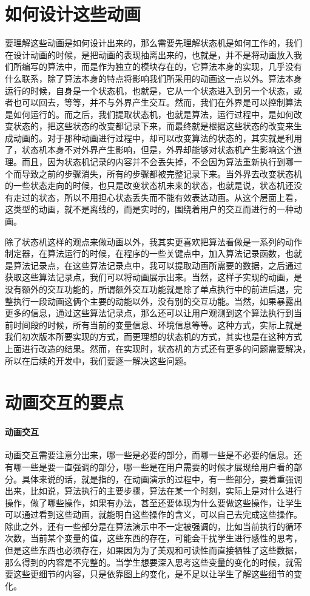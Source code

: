 \documentclass{article}
\begin{document}
\section{如何设计这些动画}
要理解这些动画是如何设计出来的，那么需要先理解状态机是如何工作的，我们
在设计动画的时候，是把动画的表现抽离出来的，也就是，并不是将动画放入我
们所编写的算法中，而是作为独立的模块存在的，它算法本身的实现，几乎没有
什么联系，除了算法本身的特点将影响我们所采用的动画这一点以外。算法本身
运行的时候，自身是一个状态机，也就是，它从一个状态进入到另一个状态，或
者也可以回去，等等，并不与外界产生交互。然而，我们在外界是可以控制算法
是如何运行的。而之后，我们提取状态机，也就是算法，运行过程中，是如何改
变状态的，把这些状态的改变都记录下来，而最终就是根据这些状态的改变来生
成动画的。对于那种动画进行过程中，却可以改变算法的状态的，其实就是利用
了，状态机本身不对外界产生影响，但是，外界却能够对状态机产生影响这个道
理。而且，因为状态机记录的内容并不会丢失掉，不会因为算法重新执行到哪一
个而导致之前的步骤消失，所有的步骤都被完整记录下来。当外界去改变状态机
的一些状态走向的时候，也只是改变状态机未来的状态，也就是说，状态机还没
有走过的状态，所以不用担心状态丢失而不能有效表达动画。从这个层面上看，
这类型的动画，就不是离线的，而是实时的，围绕着用户的交互而进行的一种动
画。

除了状态机这样的观点来做动画以外，我其实更喜欢把算法看做是一系列的动作
制定器，在算法运行的时候，在程序的一些关键点中，加入算法记录函数，也就
是算法记录点，在这些算法记录点中，我可以提取动画所需要的数据，之后通过
获取这些算法记录点，我们可以将动画展示出来。当然，这样子实现的动画，是
没有额外的交互功能的，所谓额外交互功能就是除了单点执行中的前进后退，完
整执行一段动画这俩个主要的动能以外，没有别的交互功能。当然，如果暴露出
更多的信息，通过这些算法记录点，那么还可以让用户观测到这个算法执行到当
前时间段的时候，所有当前的变量信息、环境信息等等。这种方式，实际上就是
我们初次版本所要实现的方式，而更理想的状态机的方式，其实也是在这种方式
上面进行改造的结果。然而，在实现时，状态机的方式还有更多的问题需要解决，
所以在后续的开发中，我们要逐一解决这些问题。

\section{动画交互的要点}
\paragraph{动画交互}
动画交互需要注意分出来，哪一些是必要的部分，而哪一些是不必要的信息。还
有哪一些是要一直强调的部分，哪一些是在用户需要的时候才展现给用户看的部
分。具体来说的话，就是指的，在动画演示的过程中，有一些部分，要着重强调
出来，比如说，算法执行的主要步骤，算法在某一个时刻，实际上是对什么进行
操作，做了哪些操作，如果有办法，甚至还要体现为什么要做这些操作，让学生
可以通过看到这些动画，就能明白这些操作的含义，可以自己去完成这些操作。
除此之外，还有一些部分是在算法演示中不一定被强调的，比如当前执行的循环
次数，当前某个变量的值，这些东西的存在，可能会干扰学生进行感性的思考，
但是这些东西也必须存在，如果因为为了美观和可读性而直接牺牲了这些数据，
那么得到的内容是不完整的。当学生想要深入思考这些变量的变化的时候，就需
要这些更细节的内容，只是依靠图上的变化，是不足以让学生了解这些细节的变
化。
\end{document}
